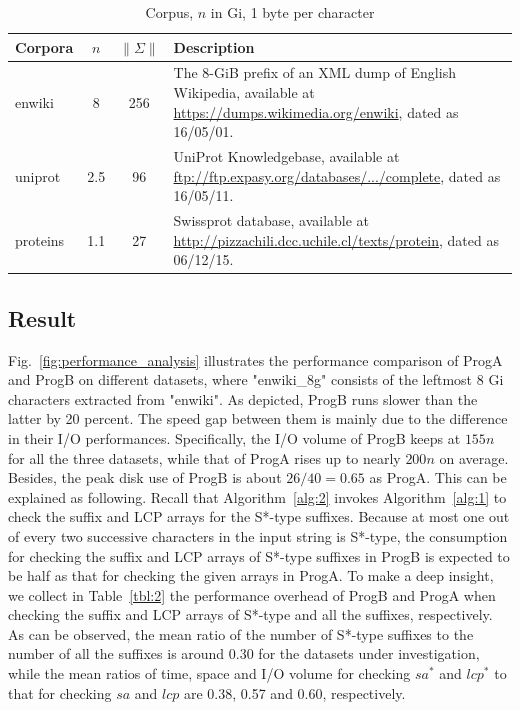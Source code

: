 \documentclass[10pt,journal,compsoc]{IEEEtran}
\begin{document}
\renewcommand\arraystretch{1.3}
\begin{table}[!t]
	\caption{Corpus, $n$ in Gi, 1 byte per character}
	\label{tbl:1}
	\centering
	\begin{tabular}{|l|c|c|p{10cm}|}
		\hline
		Corpora & \multicolumn{1}{c|}{$n$} & \multicolumn{1}{c|}{$\|\Sigma\|$} & Description \\\hline
		enwiki & 8 & 256 & The 8-GiB prefix of an XML dump of English Wikipedia, available at \url{https://dumps.wikimedia.org/enwiki}, dated as 16/05/01. \\\hline	
		uniprot & 2.5 & 96 & UniProt Knowledgebase, available at \url{ftp://ftp.expasy.org/databases/.../complete}, dated as 16/05/11. \\\hline
		proteins & 1.1 & 27 & Swissprot database, available at \url{http://pizzachili.dcc.uchile.cl/texts/protein}, dated as 06/12/15. \\\hline
	\end{tabular}
\end{table}


\subsection{Result} \label{sec:experiments:result}

Fig.~\ref{fig:performance_analysis} illustrates the performance comparison of ProgA and ProgB on different datasets, where "enwiki\_8g" consists of the leftmost 8 Gi characters extracted from "enwiki". As depicted, ProgB runs slower than the latter by 20 percent. The speed gap between them is mainly due to the difference in their I/O performances. Specifically, the I/O volume of ProgB keeps at $155n$ for all the three datasets, while that of ProgA rises up to nearly $200n$ on average. Besides, the peak disk use of ProgB is about $26/40=0.65$ as ProgA. This can be explained as following. Recall that Algorithm~\ref{alg:2} invokes Algorithm~\ref{alg:1} to check the suffix and LCP arrays for the S*-type suffixes. Because at most one out of every two successive characters in the input string is S*-type, the consumption for checking the suffix and LCP arrays of S*-type suffixes in ProgB is expected to be half as that for checking the given arrays in ProgA. To make a deep insight, we collect in Table~\ref{tbl:2} the performance overhead of ProgB and ProgA when checking the suffix and LCP arrays of S*-type and all the suffixes, respectively. As can be observed, the mean ratio of the number of S*-type suffixes to the number of all the suffixes is around 0.30 for the datasets under investigation, while the mean ratios of time, space and I/O volume for checking $sa^*$ and $lcp^*$ to that for checking $sa$ and $lcp$ are 0.38, 0.57 and 0.60, respectively. 
\end{document}
